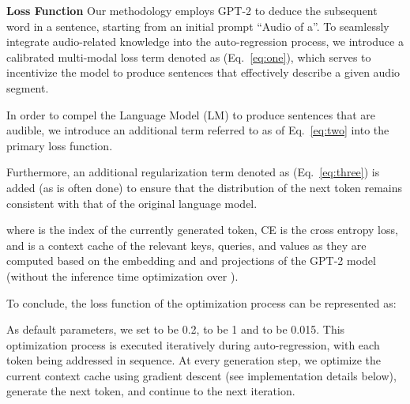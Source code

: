 \documentclass{article}
\begin{document}
\noindent\textbf{Loss Function\quad}
Our methodology employs GPT-2 to deduce the subsequent word in a sentence, starting from an initial prompt ``Audio of a''.
To seamlessly integrate audio-related knowledge into the auto-regression process, we introduce a calibrated multi-modal loss term denoted as  (Eq.~\ref{eq:one}), which serves to incentivize the model to produce sentences that effectively describe a given audio segment. 

In order to compel the Language Model (LM) to produce sentences that are audible, we introduce an additional term referred to as  of Eq.~\ref{eq:two} into the primary loss function.

Furthermore, an additional regularization term denoted as  (Eq.~\ref{eq:three}) is added (as is often done) to ensure that the distribution of the next token remains consistent with that of the original language model.


where  is the index of the currently generated token, CE is the cross entropy loss, and  is a context cache of the relevant keys, queries, and values as they are computed based on the embedding and   and  projections of the GPT-2 model (without the inference time optimization over ).

To conclude, the loss function of the optimization process can be represented as:


As default parameters, we set  to be 0.2,  to be 1 and  to be 0.015.
This optimization process is executed iteratively during auto-regression, with each token being addressed in sequence. At every generation step, we optimize the current context cache  using gradient descent (see implementation details below), generate the next token, and continue to the next iteration.













 
\end{document}
